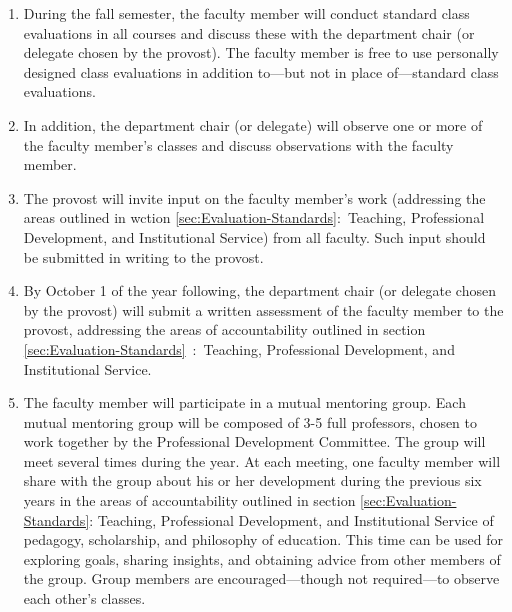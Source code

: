 \begin{enumerate}[label=\alph*)]
{					\begin{enumerate}[label=\arabic*)]

						\item{ During the fall semester, the faculty member will
							conduct standard class evaluations in all courses and
							discuss these with the department chair (or delegate chosen
							by the provost). The faculty member is free to use
							personally designed class evaluations in addition to---but
							not in place of---standard class evaluations.}

						\item{ In addition, the department chair (or
							delegate) will observe one or more of the faculty
							member's classes and discuss observations with the
							faculty member. }

						\item{ The provost will invite input on the faculty member's work (addressing
							the areas outlined in
							wction
							\ref{sec:Evaluation-Standards}:~Teaching, Professional Development, and
							Institutional Service) from all faculty. Such input should be submitted in
							writing to the provost. }

						\item{ By October 1 of the year following, the department chair (or delegate
							chosen by the provost) will submit a written assessment of the faculty member to
							the provost, addressing the areas of accountability outlined in
							section
							\ref{sec:Evaluation-Standards}~:~Teaching, Professional Development, and Institutional Service. }

						\item{ The faculty member will participate in a mutual mentoring group. Each
							mutual mentoring group will be composed of 3-5 full professors, chosen to work
							together by the Professional Development Committee. The group will meet several
							times during the year. At each meeting, one faculty member will share with the
							group about his or her development during the previous six years in the areas of
							accountability outlined in
							section
							\ref{sec:Evaluation-Standards}: Teaching, Professional Development,
							and Institutional Service of pedagogy, scholarship, and philosophy of education.
							This time can be used for exploring goals, sharing insights, and obtaining
							advice from other members of the group. Group members are encouraged---though
							not required---to observe each other's classes. }


\end{enumerate}}
\end{enumerate}
